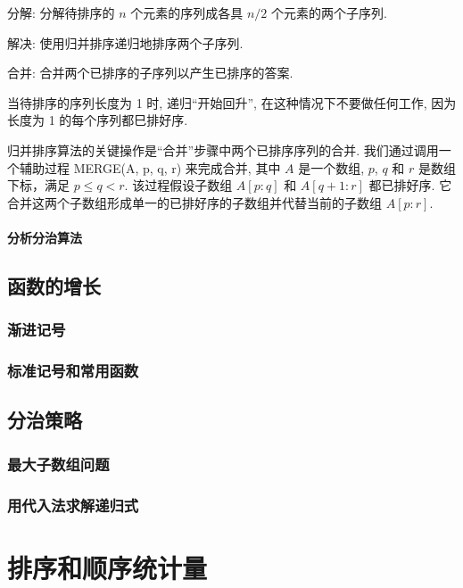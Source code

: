 \documentclass[oneside,10pt,fontset=none]{ctexbook}
\begin{document}
分解: 分解待排序的 $n$ 个元素的序列成各具 $n/2$ 个元素的两个子序列.

解决: 使用归并排序递归地排序两个子序列.

合并: 合并两个已排序的子序列以产生已排序的答案.

当待排序的序列长度为 1 时, 递归``开始回升'', 在这种情况下不要做任何工作, 因为长度为 1 的每个序列都巳排好序.

归并排序算法的关键操作是``合并''步骤中两个已排序序列的合并. 我们通过调用一个辅助过程 MERGE(A, p, q, r) 来完成合并, 其中 $A$ 是一个数组, $p$, $q$ 和 $r$ 是数组下标，满足 $p\leq q<r$. 该过程假设子数组 $A[p:q]$ 和 $A[q+1:r]$ 都已排好序. 它合并这两个子数组形成单一的已排好序的子数组并代替当前的子数组 $A[p:r]$.

\subsection{分析分治算法}

\chapter{函数的增长}

\section{渐进记号}

\section{标准记号和常用函数}

\chapter{分治策略}

\section{最大子数组问题}

\section{用代入法求解递归式}



\part{排序和顺序统计量}
\end{document}
